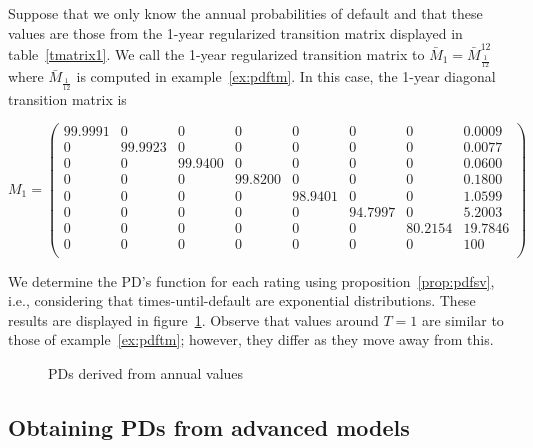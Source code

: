 \documentclass[11pt,fleqn]{book} %
\begin{document}
\begin{example}
	\label{ex:pdfsv}
	Suppose that we only know the annual probabilities of default and that these 
	values are those from the 1-year regularized transition matrix displayed in
	table~\ref{tmatrix1}. We call the 1-year regularized transition matrix to 
	$\bar{M}_1 = \bar{M}_{\frac{1}{12}}^{12}$ where $\bar{M}_{\frac{1}{12}}$ 
	is computed in example~\ref{ex:pdftm}. In this case, the 1-year diagonal 
	transition matrix is
	{\small
	\begin{displaymath}
		M_1 = \left(
		\begin{array}{cccccccc}
			99.9991 & 0 & 0 & 0 & 0 & 0 & 0 & 0.0009 \\
			0 & 99.9923 & 0 & 0 & 0 & 0 & 0 & 0.0077 \\
			0 & 0 & 99.9400 & 0 & 0 & 0 & 0 & 0.0600 \\
			0 & 0 & 0 & 99.8200 & 0 & 0 & 0 & 0.1800 \\
			0 & 0 & 0 & 0 & 98.9401 & 0 & 0 & 1.0599 \\
			0 & 0 & 0 & 0 & 0 & 94.7997 & 0 & 5.2003 \\
			0 & 0 & 0 & 0 & 0 & 0 & 80.2154 & 19.7846 \\
			0 & 0 & 0 & 0 & 0 & 0 & 0 & 100 \\
		\end{array}
		\right)
	\end{displaymath}\par}
	We determine the PD's function for each rating using  
	proposition~\ref{prop:pdfsv}, i.e., considering that times-until-default
	are exponential distributions. These results are displayed in 
	figure~\ref{fig:pdfsv}. Observe that values around $T=1$ are similar 
	to those of example~\ref{ex:pdftm}; however, they differ as they move 
	away from this.
\end{example}

\begin{figure}[!ht]
	\centering
	\caption{PDs derived from annual values}
	\label{fig:pdfsv}
\end{figure}

\subsection{Obtaining PDs from advanced models}
\end{document}
